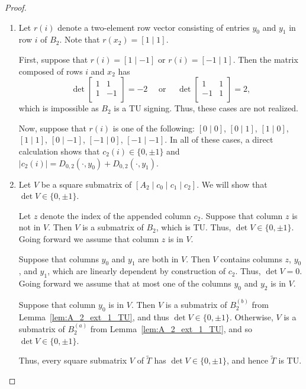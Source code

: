 \documentclass{article}
\theoremstyle{definition}
\begin{document}
\begin{proof}
    \begin{enumerate}
        \item Let $r(i)$ denote a two-element row vector consisting of entries $y_{0}$ and $y_{1}$ in row $i$ of $B_{2}$. Note that $r(x_{2}) = [1 \mid 1]$.

        First, suppose that $r(i) = [1 \mid -1]$ or $r(i) = [-1 \mid 1]$. Then the matrix composed of rows $i$ and $x_{2}$ has
        \[
            \det \begin{bmatrix}
                1 & 1 \\
                1 & -1 \\
            \end{bmatrix} = -2
            \quad \text{ or } \quad
            \det \begin{bmatrix}
                1 & 1 \\
                -1 & 1 \\
            \end{bmatrix} = 2,
        \]
        which is impossible as $B_{2}$ is a TU signing. Thus, these cases are not realized.

        Now, suppose that $r(i)$ is one of the following: $[0 \mid 0]$, $[0 \mid 1]$, $[1 \mid 0]$, $[1 \mid 1]$, $[0 \mid -1]$, $[-1 \mid 0]$, $[-1 \mid -1]$. In all of these cases, a direct calculation shows that $c_{2}(i) \in \{0, \pm 1\}$ and $|c_{2}(i)| = D_{0, 2} (\cdot, y_{0}) + D_{0, 2} (\cdot, y_{1})$.

        \item Let $V$ be a square submatrix of $[A_{2} \mid c_{0} \mid c_{1} \mid c_{2}]$. We will show that $\det V \in \{0, \pm 1\}$.

        Let $z$ denote the index of the appended column $c_{2}$. Suppose that column $z$ is not in $V$. Then $V$ is a submatrix of $B_{2}$, which is TU. Thus, $\det V \in \{0, \pm 1\}$. Going forward we assume that column $z$ is in $V$.

        Suppose that columns $y_{0}$ and $y_{1}$ are both in $V$. Then $V$ contains columns $z$, $y_{0}$, and $y_{1}$, which are linearly dependent by construction of $c_{2}$. Thus, $\det V = 0$. Going forward we assume that at most one of the columns $y_{0}$ and $y_{2}$ is in $V$.

        Suppose that column $y_{0}$ is in $V$. Then $V$ is a submatrix of $B_{2}^{(b)}$ from Lemma~\ref{lem:A_2_ext_1_TU}, and thus $\det V \in \{0, \pm 1\}$. Otherwise, $V$ is a submatrix of $B_{2}^{(a)}$ from Lemma~\ref{lem:A_2_ext_1_TU}, and so $\det V \in \{0, \pm 1\}$.

        Thus, every square submatrix $V$ of $\tilde{T}$ has $\det V \in \{0, \pm 1\}$, and hence $\tilde{T}$ is TU.
    \end{enumerate}
\end{proof}
\end{document}
